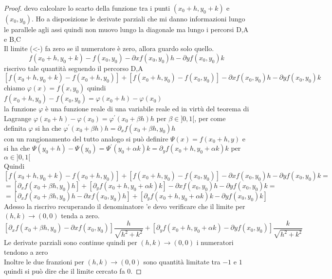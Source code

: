 \begin{proof}
	devo calcolare lo scarto della funzione tra i punti $(x_0+h,y_0+k)$ e $(x_0,y_0)$. Ho a disposizione le derivate parziali che mi danno informazioni lungo le parallele agli assi quindi non muovo lungo la diagonale ma lungo i percorsi D,A e B,C\\
	Il limite  (<-) fa zero se il numeratore è zero, allora guardo solo quello.\\
	$$f(x_0+h,y_0+k) -f(x_0,y_0)- \partial{x}f(x_0,y_0)h - \partial{y}f(x_0,y_0)k$$
	riscrivo tale quantità seguendo il percorso D,A
	$$ [f(x_0+h,y_0+k) - f(x_0+h,y_0)] + [f(x_0+h,y_0) - f(x_0,y_0)] - \partial{x}f(x_0,y_0)h - \partial{y}f(x_0,y_0)k$$
	chiamo $\varphi (x) = f(x,y_0)$ quindi $f(x_0+h,y_0)-f(x_0,y_0) = \varphi (x_0+h)-\varphi (x_0)$\\
	la funzione $\varphi $ è una funzione reale di una variabile reale ed in virtù del teorema di Lagrange $\varphi (x_0+h)-\varphi (x_0) = \varphi^{'}(x_0 + \beta h)h$ per $\beta\in ]0,1[ $, per come definita $\varphi$ si ha che $\varphi^{'}(x_0 + \beta h)h = \partial_{x}f(x_0+\beta h,y_0)h$\\
	con un rangionamento del tutto analogo si può definire $\varPsi (x) = f(x_0+h,y)$ e si ha che $\varPsi (y_0+h)-\varPsi (y_0) = \varPsi^{'}(y_0 + \alpha k)k = \partial_{y}f(x_0+h,y_0+\alpha k)k$ per $\alpha\in ]0,1[ $\\
	Quindi
	$$ [f(x_0+h,y_0+k) - f(x_0+h,y_0)] + [f(x_0+h,y_0) - f(x_0,y_0)] - \partial{x}f(x_0,y_0)h - \partial{y}f(x_0,y_0)k = $$
	$$= [\partial_{x}f(x_0+\beta h,y_0)h] + [\partial_{y}f(x_0+h,y_0+\alpha k)k] - \partial{x}f(x_0,y_0)h - \partial{y}f(x_0,y_0)k = $$
	$$= [\partial_{x}f(x_0+\beta h,y_0)h - \partial{x}f(x_0,y_0)h] + [\partial_{y}f(x_0+h,y_0+\alpha k)k  - \partial{y}f(x_0,y_0)k] $$
	Adesso la riscrivo recuperando il denominatore 	'e devo verificare che il limite per $(h,k)\rightarrow (0,0)$ tenda a zero.\\
	
	$$[\partial_{x}f(x_0+\beta h,y_0)-\partial{x}f(x_0,y_0)] \frac{h}{\sqrt{h^2+k^2}} + [\partial_{y}f(x_0+h,y_0+\alpha k) - \partial{y}f(x_0,y_0)]\frac{k}{\sqrt{h^2+k^2}} $$
	Le derivate parziali sono continue quindi per $(h,k)\rightarrow (0,0)$ i numeratori tendono a zero\\
	Inoltre le due franzioni per $(h,k)\rightarrow (0,0)$ sono quantità limitate tra $-1$ e $1$ quindi si può dire che il limite cercato fa 0.
\end{proof}


